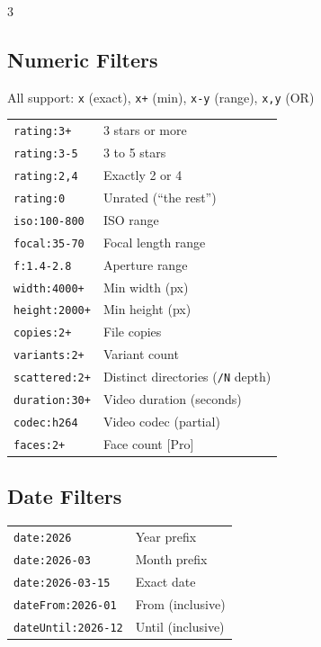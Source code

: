 \documentclass[a4paper,landscape,8pt]{article}
\newcommand{\cmd}[1]{\texttt{\footnotesize #1}}
\newcommand{\pro}{\textcolor{maki-teal}{\scriptsize [Pro]}}
\begin{document}
\begin{multicols}{3}
\subsection{Numeric Filters}
All support: \cmd{x} (exact), \cmd{x+} (min), \cmd{x-y} (range), \cmd{x,y} (OR)
\begin{tabularx}{\columnwidth}{@{}lX@{}}
\cmd{rating:3+} & 3 stars or more \\
\cmd{rating:3-5} & 3 to 5 stars \\
\cmd{rating:2,4} & Exactly 2 or 4 \\
\cmd{rating:0} & Unrated (``the rest'') \\
\cmd{iso:100-800} & ISO range \\
\cmd{focal:35-70} & Focal length range \\
\cmd{f:1.4-2.8} & Aperture range \\
\cmd{width:4000+} & Min width (px) \\
\cmd{height:2000+} & Min height (px) \\
\cmd{copies:2+} & File copies \\
\cmd{variants:2+} & Variant count \\
\cmd{scattered:2+} & Distinct directories (\cmd{/N} depth) \\
\cmd{duration:30+} & Video duration (seconds) \\
\cmd{codec:h264} & Video codec (partial) \\
\cmd{faces:2+} & Face count \pro \\
\end{tabularx}

\subsection{Date Filters}
\begin{tabularx}{\columnwidth}{@{}lX@{}}
\cmd{date:2026} & Year prefix \\
\cmd{date:2026-03} & Month prefix \\
\cmd{date:2026-03-15} & Exact date \\
\cmd{dateFrom:2026-01} & From (inclusive) \\
\cmd{dateUntil:2026-12} & Until (inclusive) \\
\end{tabularx}


\end{multicols}
\end{document}
